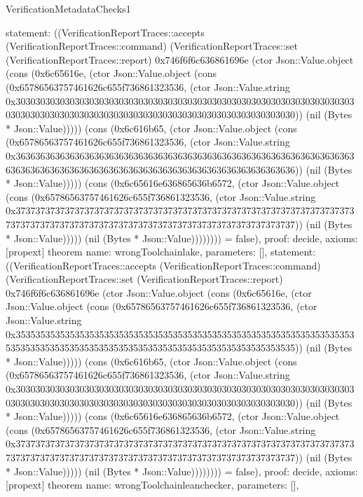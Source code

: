 \begin{lexlean}{VerificationMetadataChecks1}
\begin{semanticmodule}
{  statement: ((VerificationReportTraces::accepts (VerificationReportTraces::command) (VerificationReportTraces::set (VerificationReportTraces::report) 0x746f6f6c636861696e (ctor Json::Value.object (cons (0x6c65616e, (ctor Json::Value.object (cons (0x65786563757461626c655f736861323536, (ctor Json::Value.string 0x30303030303030303030303030303030303030303030303030303030303030303030303030303030303030303030303030303030303030303030303030303030)) (nil (Bytes * Json::Value))))) (cons (0x6c616b65, (ctor Json::Value.object (cons (0x65786563757461626c655f736861323536, (ctor Json::Value.string 0x36363636363636363636363636363636363636363636363636363636363636363636363636363636363636363636363636363636363636363636363636363636)) (nil (Bytes * Json::Value))))) (cons (0x6c65616e636865636b6572, (ctor Json::Value.object (cons (0x65786563757461626c655f736861323536, (ctor Json::Value.string 0x37373737373737373737373737373737373737373737373737373737373737373737373737373737373737373737373737373737373737373737373737373737)) (nil (Bytes * Json::Value))))) (nil (Bytes * Json::Value)))))))) = false),
  proof: decide{},
  axioms: [propext]
}
theorem{
  name: wrongToolchainlake,
  parameters: [],
  statement: ((VerificationReportTraces::accepts (VerificationReportTraces::command) (VerificationReportTraces::set (VerificationReportTraces::report) 0x746f6f6c636861696e (ctor Json::Value.object (cons (0x6c65616e, (ctor Json::Value.object (cons (0x65786563757461626c655f736861323536, (ctor Json::Value.string 0x35353535353535353535353535353535353535353535353535353535353535353535353535353535353535353535353535353535353535353535353535353535)) (nil (Bytes * Json::Value))))) (cons (0x6c616b65, (ctor Json::Value.object (cons (0x65786563757461626c655f736861323536, (ctor Json::Value.string 0x30303030303030303030303030303030303030303030303030303030303030303030303030303030303030303030303030303030303030303030303030303030)) (nil (Bytes * Json::Value))))) (cons (0x6c65616e636865636b6572, (ctor Json::Value.object (cons (0x65786563757461626c655f736861323536, (ctor Json::Value.string 0x37373737373737373737373737373737373737373737373737373737373737373737373737373737373737373737373737373737373737373737373737373737)) (nil (Bytes * Json::Value))))) (nil (Bytes * Json::Value)))))))) = false),
  proof: decide{},
  axioms: [propext]
}
theorem{
  name: wrongToolchainleanchecker,
  parameters: [],
}
\end{semanticmodule}
\end{lexlean}
